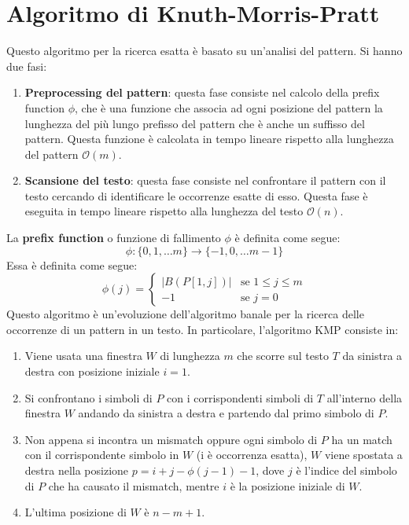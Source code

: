 \section{Algoritmo di Knuth-Morris-Pratt}
Questo algoritmo per la ricerca esatta è basato su un'analisi del pattern. Si hanno due fasi:
\begin{enumerate}
    \item \textbf{Preprocessing del pattern}: questa fase consiste nel calcolo della prefix function $\phi$, che è una funzione che associa ad ogni posizione del pattern la lunghezza del più lungo prefisso del pattern che è anche un suffisso del pattern. Questa funzione è calcolata in tempo lineare rispetto alla lunghezza del pattern $\mathcal{O}(m)$.
    \item \textbf{Scansione del testo}: questa fase consiste nel confrontare il pattern con il testo cercando di identificare le occorrenze esatte di esso. Questa fase è eseguita in tempo lineare rispetto alla lunghezza del testo $\mathcal{O}(n)$.
\end{enumerate}
La \textbf{prefix function} o funzione di fallimento $\phi$ è definita come segue:
\begin{equation}
    \phi: \{0, 1, \dots m\} \to \{-1, 0, \dots m-1\}
\end{equation}
Essa è definita come segue:
\begin{equation}
    \phi(j) = \begin{cases} |B(P[1, j])| & \text{se } 1 \leq j \leq m \\-1 & \text{se } j = 0 \end{cases}
\end{equation}
Questo algoritmo è un’evoluzione dell'algoritmo banale per la ricerca delle occorrenze di un pattern in un testo. In particolare, l'algoritmo KMP consiste in:
\begin{enumerate}
    \item Viene usata una finestra $W$ di lunghezza $m$ che scorre sul testo $T$ da sinistra a destra con posizione iniziale $i = 1$.
    \item Si confrontano i simboli di $P$ con i corrispondenti simboli di $T$ all'interno della finestra $W$ andando da sinistra a destra e partendo dal primo simbolo di $P$.
    \item Non appena si incontra un mismatch oppure ogni simbolo di $P$ ha un match con il corrispondente simbolo in $W$ (i è occorrenza esatta), $W$ viene spostata a destra nella posizione $p = i + j - \phi(j - 1) - 1$, dove $j$ è l'indice del simbolo di $P$ che ha causato il mismatch, mentre $i$ è la posizione iniziale di $W$.
    \item L'ultima posizione di $W$ è $n - m + 1$.
\end{enumerate}
